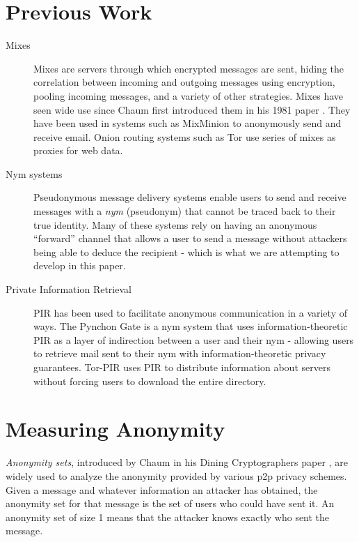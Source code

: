\documentclass[twocolumn]{paper}
\begin{document}
\section{Previous Work}
\begin{description}
\item[Mixes] Mixes are servers through which encrypted messages are sent, hiding the correlation between incoming and outgoing messages using encryption, pooling incoming messages, and a variety of other strategies. Mixes have seen wide use since Chaum first introduced them in his 1981 paper \cite{chaum-mix}. They have been used in systems such as MixMinion\cite{minion-design} to anonymously send and receive email. Onion routing systems such as Tor \cite{tor-design} use series of mixes as proxies for web data. 

\item[Nym systems] Pseudonymous message delivery systems enable users to send and receive messages with a \textit{nym} (pseudonym) that cannot be traced back to their true identity. Many of these systems rely on having an anonymous ``forward'' channel that allows a user to send a message without attackers being able to deduce the recipient - which is what we are attempting to develop in this paper. 

\item[Private Information Retrieval] PIR has been used to facilitate anonymous communication in a variety of ways. The Pynchon Gate \cite{sassaman:wpes2005} is a nym system that uses information-theoretic PIR as a layer of indirection between a user and their nym - allowing users to retrieve mail sent to their nym with information-theoretic privacy guarantees. Tor-PIR \cite{TODO} uses PIR to distribute information about servers without forcing users to download the entire directory. 

\end{description}

\section{Measuring Anonymity}
\textit{Anonymity sets}, introduced by Chaum in his Dining Cryptographers paper \cite{chaum-dc}, are widely used to analyze the anonymity provided by various p2p privacy schemes. Given a message and whatever information an attacker has obtained, the anonymity set for that message is the set of users who could have sent it. An anonymity set of size 1 means that the attacker knows exactly who sent the message.
\end{document}
